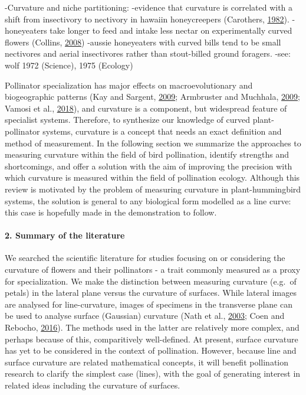 \documentclass[]{article}
\let\oldparagraph\paragraph
\renewcommand{\paragraph}[1]{\oldparagraph{#1}\mbox{}}
\begin{document}
-Curvature and niche partitioning: -evidence that curvature is
correlated with a shift from insectivory to nectivory in hawaiin
honeycreepers (Carothers, \protect\hyperlink{ref-carothers_1982}{1982}).
-honeyeaters take longer to feed and intake less nectar on
experimentally curved flowers (Collins,
\protect\hyperlink{ref-collins_2008}{2008}) -aussie honeyeaters with
curved bills tend to be small nectivores and aerial insectivores rather
than stout-billed ground foragers. -see: wolf 1972 (Science), 1975
(Ecology)

Pollinator specialization has major effects on macroevolutionary and
biogeographic patterns (Kay and Sargent,
\protect\hyperlink{ref-kay_2009}{2009}; Armbruster and Muchhala,
\protect\hyperlink{ref-armbruster_2009}{2009}; Vamosi et al.,
\protect\hyperlink{ref-vamosi_2018}{2018}), and curvature is a
component, but widespread feature of specialist systems. Therefore, to
synthesize our knowledge of curved plant-pollinator systems, curvature
is a concept that needs an exact definition and method of measurement.
In the following section we summarize the approaches to measuring
curvature within the field of bird pollination, identify strengths and
shortcomings, and offer a solution with the aim of improving the
precision with which curvature is measured within the field of
pollination ecology. Although this review is motivated by the problem of
measuring curvature in plant-hummingbird systems, the solution is
general to any biological form modelled as a line curve: this case is
hopefully made in the demonstration to follow.

\hypertarget{summary-of-the-literature}{%
\paragraph{2. Summary of the
literature}\label{summary-of-the-literature}}

We searched the scientific literature for studies focusing on or
considering the curvature of flowers and their pollinators - a trait
commonly measured as a proxy for specialization. We make the distinction
between measuring curvature (e.g.~of petals) in the lateral plane versus
the curvature of surfaces. While lateral images are analysed for
line-curvature, images of specimens in the transverse plane can be used
to analyse surface (Gaussian) curvature (Nath et al.,
\protect\hyperlink{ref-nath_2003}{2003}; Coen and Rebocho,
\protect\hyperlink{ref-coen_2016}{2016}). The methods used in the latter
are relatively more complex, and perhaps because of this, comparitively
well-defined. At present, surface curvature has yet to be considered in
the context of pollination. However, because line and surface curvature
are related mathematical concepts, it will benefit pollination research
to clarify the simplest case (lines), with the goal of generating
interest in related ideas including the curvature of surfaces.
\end{document}
